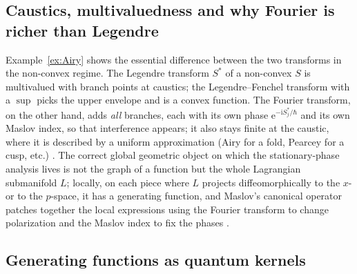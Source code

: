 \documentclass[11pt,a4paper]{article}
\newcommand{\ii}{\mathrm{i}}
\newcommand{\ee}{\mathrm{e}}
\newcommand{\hb}{\hbar}
\theoremstyle{plain}
\theoremstyle{definition}
\theoremstyle{remark}
\begin{document}
\subsection{Caustics, multivaluedness and why Fourier is richer than Legendre}\label{sec:caustics}

Example~\ref{ex:Airy} shows the essential difference between the two transforms in the non-convex regime. The Legendre transform $S^*$ of a non-convex $S$ is multivalued with branch points at caustics; the Legendre--Fenchel transform with a $\sup$ picks the upper envelope and is a convex function. The Fourier transform, on the other hand, adds \emph{all} branches, each with its own phase $\ee^{-\ii S^*_j/\hb}$ and its own Maslov index, so that interference appears; it also stays finite at the caustic, where it is described by a uniform approximation (Airy for a fold, Pearcey for a cusp, etc.) \cite{Duistermaat,Berry,Arnold}. The correct global geometric object on which the stationary-phase analysis lives is not the graph of a function but the whole Lagrangian submanifold $L$; locally, on each piece where $L$ projects diffeomorphically to the $x$- or to the $p$-space, it has a generating function, and Maslov's canonical operator patches together the local expressions using the Fourier transform to change polarization and the Maslov index to fix the phases \cite{Maslov,MaslovFedoriuk,Hormander2}.

\subsection{Generating functions as quantum kernels}\label{sec:kernels}
\end{document}
